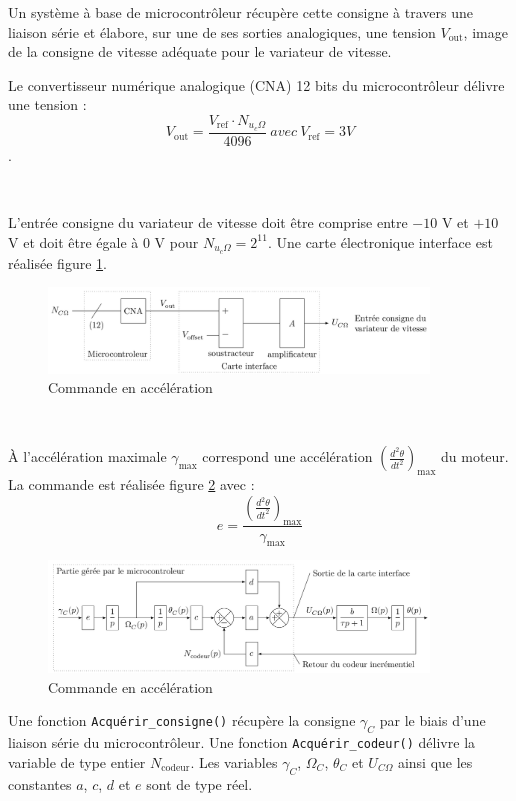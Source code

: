 Un système à base de microcontrôleur récupère cette consigne à travers une liaison série et élabore, sur une de ses sorties analogiques, une tension $V_{\text{out}}$, image de la consigne de vitesse adéquate pour le variateur de vitesse.

Le convertisseur numérique analogique (CNA) 12 bits du microcontrôleur délivre une tension :
$$V_{\text{out}} = \frac{V_{\text{ref}}\cdot N_{u_c\Omega}}{4096}\ avec\ V_{\text{ref}} = 3V$$.

~\

L'entrée consigne du variateur de vitesse doit être comprise entre $-10$ V et $+10$ V et doit être égale à 0 V pour $N_{u_c\Omega} = 2^{11}$. Une carte électronique interface est réalisée figure \ref{fig24}.

\begin{figure}[H]
\centering
\includegraphics[width=0.9\textwidth]{img/img24}
\caption{\label{fig24}Commande en accélération}
\end{figure}



~\

À l'accélération maximale $\gamma_{\max}$ correspond une accélération $\left(\frac{d^2\theta}{dt^2}\right)_{\max}$ du moteur. La commande est réalisée figure \ref{fig25} avec :
$$e = \frac{\left(\frac{d^2\theta}{dt^2}\right)_{\max}}{\gamma_{\max}}$$

\begin{figure}[H]
\centering
\includegraphics[width=0.9\textwidth]{img/img25}
\caption{\label{fig25}Commande en accélération}
\end{figure}

Une fonction \texttt{Acquérir\_consigne()} récupère la consigne $\gamma_C$ par le biais d'une liaison série du microcontrôleur. Une fonction \texttt{Acquérir\_codeur()} délivre la variable de type entier $N_{\text{codeur}}$. Les variables $\gamma_C$, $\Omega_C$, $\theta_C$ et $U_{C\Omega}$ ainsi que les constantes $a$, $c$, $d$ et $e$ sont de type réel.

